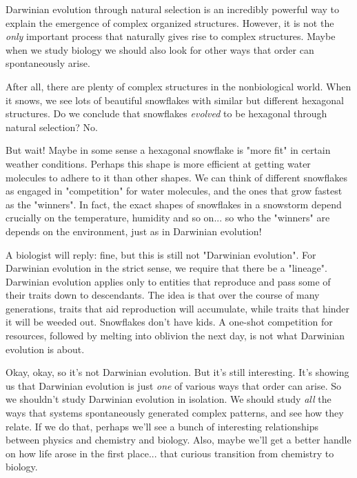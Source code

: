 


Darwinian evolution through natural selection is an incredibly powerful
way to explain the emergence of complex organized structures.  However,
it is not the \emph{only} important process that naturally gives rise to
complex structures.  Maybe when we study biology we should also look for
other ways that order can spontaneously arise.

After all, there are plenty of complex structures in the nonbiological
world.  When it snows, we see lots of beautiful snowflakes with similar
but different hexagonal structures.  Do we conclude that snowflakes
\emph{evolved} to be hexagonal through natural selection?  No.

But wait!  Maybe in some sense a hexagonal snowflake is "more fit" in
certain weather conditions.  Perhaps this shape is more efficient at
getting water molecules to adhere to it than other shapes.  We can
think of different snowflakes as engaged in "competition" for water
molecules, and the ones that grow fastest as the "winners".  In fact,
the exact shapes of snowflakes in a snowstorm depend crucially on 
the temperature, humidity and so on... so who the "winners" are depends
on the environment, just as in Darwinian evolution!

A biologist will reply: fine, but this is still not "Darwinian
evolution".  For Darwinian evolution in the strict sense, we require
that there be a "lineage".  Darwinian evolution applies only to entities
that reproduce and pass some of their traits down to descendants.  The
idea is that over the course of many generations, traits that aid
reproduction will accumulate, while traits that hinder it will be weeded
out.  Snowflakes don't have kids.  A one-shot competition for resources,
followed by melting into oblivion the next day, is not what Darwinian
evolution is about.

Okay, okay, so it's not Darwinian evolution.  But it's still
interesting.  It's showing us that Darwinian evolution is just \emph{one}
of various ways that order can arise.  So we shouldn't study Darwinian
evolution in isolation.  We should study \emph{all} the ways that systems
spontaneously generated complex patterns, and see how they relate.  If
we do that, perhaps we'll see a bunch of interesting relationships
between physics and chemistry and biology.  Also, maybe we'll get a better
handle on how life arose in the first place... that curious transition
from chemistry to biology.  

